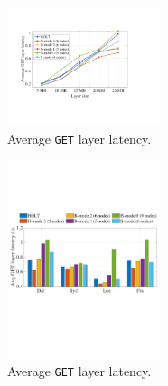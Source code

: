 %


\begin{figure}[t]
	\centering
	\includegraphics[width=0.4\textwidth]{graphs/dalprimary.pdf}
	\caption{Average \texttt{GET} layer latency.}
	\label{fig:eval-dalprimary}
	
\end{figure}

\begin{figure}[t]
	\centering
	\includegraphics[width=0.4\textwidth]{graphs/total-traces.pdf}
	\caption{Average \texttt{GET} layer latency.} %
	\label{fig:eval-total-traces}
	
\end{figure}